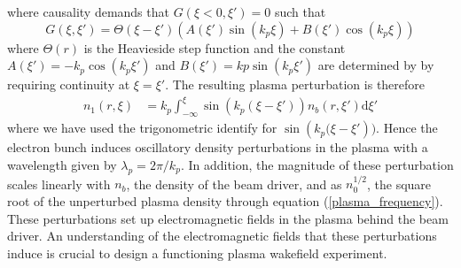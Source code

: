 where causality demands that $G\left(\xi<0 ,\xi'\right)=0$ such that
\begin{equation}
G\left(\xi,\xi'\right)=\Theta(\xi-\xi')\left(A(\xi')\sin\left(k_p\xi \right) + B(\xi')\cos\left(k_p\xi \right)\right) 
\end{equation}
where $\Theta(r)$ is the Heavieside step function and the constant $A(\xi')=-k_p\cos(k_p\xi')$ and $B(\xi')=kp\sin(k_p\xi')$ are determined by by requiring continuity at $\xi=\xi'$. The resulting plasma perturbation is therefore
\begin{equation}
\begin{aligned}
n_1\left(r,\xi \right)&=k_p\int_{-\infty}^{\xi}\sin\left(k_p(\xi-\xi')\right)n_b\left(r,\xi' \right) \mathrm{d}\xi'
\end{aligned}
\label{density_perturbation} 
\end{equation} %
where we have used the trigonometric identify for $\sin\left(k_p(\xi-\xi'\right))$. Hence the electron bunch induces oscillatory density perturbations in the plasma with a wavelength given by $\lambda_p=2\pi/k_p$. In addition, the magnitude of these perturbation scales linearly with $n_b$, the density of the beam driver, and as $n_0^{1/2}$, the square root of the unperturbed plasma density through equation (\ref{plasma_frequency}). These perturbations set up electromagnetic fields in the plasma behind the beam driver. An understanding of the electromagnetic fields that these perturbations induce is crucial to design a functioning plasma wakefield experiment.
